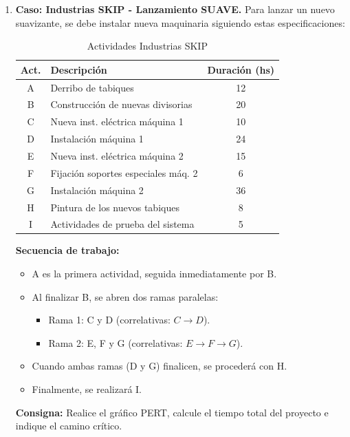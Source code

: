\documentclass[../main]{subfiles}
\begin{document}
\begin{enumerate}
    \item \textbf{Caso: Industrias SKIP - Lanzamiento SUAVE.}
    Para lanzar un nuevo suavizante, se debe instalar nueva maquinaria siguiendo estas especificaciones:

    \begin{table}[h!]
        \centering
        \begin{tabular}{|c|l|c|} \hline  
        \textbf{Act.} & \textbf{Descripción} & \textbf{Duración (hs)} \\ \hline \hline
        A & Derribo de tabiques & 12 \\
        B & Construcción de nuevas divisorias & 20 \\
        C & Nueva inst. eléctrica máquina 1 & 10 \\
        D & Instalación máquina 1 & 24 \\
        E & Nueva inst. eléctrica máquina 2 & 15 \\
        F & Fijación soportes especiales máq. 2 & 6 \\
        G & Instalación máquina 2 & 36 \\
        H & Pintura de los nuevos tabiques & 8 \\
        I & Actividades de prueba del sistema & 5 \\ \hline
         \end{tabular}
         \caption{Actividades Industrias SKIP}
         \label{tab:industrias_skip}
    \end{table}

    \textbf{Secuencia de trabajo:}
    \begin{itemize}
        \item A es la primera actividad, seguida inmediatamente por B.
        \item Al finalizar B, se abren dos ramas paralelas:
        \begin{itemize}
            \item Rama 1: C y D (correlativas: $C \rightarrow D$).
            \item Rama 2: E, F y G (correlativas: $E \rightarrow F \rightarrow G$).
        \end{itemize}
        \item Cuando ambas ramas (D y G) finalicen, se procederá con H.
        \item Finalmente, se realizará I.
    \end{itemize}

    \textbf{Consigna:} Realice el gráfico PERT, calcule el tiempo total del proyecto e indique el camino crítico.

\end{enumerate}
\end{document}
